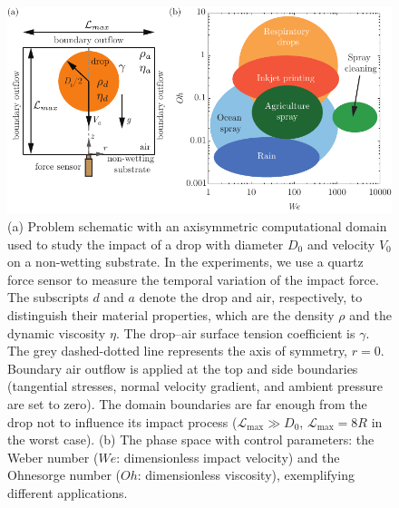 \documentclass{jfm}
\begin{document}
\begin{figure}
	\centering
	\includegraphics[width=\textwidth]{Figures/Schematic_v2.pdf}
	\caption{(a) Problem schematic with an axisymmetric computational domain used to study the impact of a drop with diameter $D_0$ and velocity $V_0$ on a non-wetting substrate. In the experiments, we use a quartz force sensor to measure the temporal variation of the impact force. The subscripts $d$ and $a$ denote the drop and air, respectively, to distinguish their material properties, which are the density $\rho$ and the dynamic viscosity $\eta$. The drop–air surface tension coefficient is $\gamma$. The grey dashed-dotted line represents the axis of symmetry, $r = 0$. Boundary air outflow is applied at the top and side boundaries (tangential stresses, normal velocity gradient, and ambient pressure are set to zero). The domain boundaries are far enough from the drop not to influence its impact process ($\mathcal{L}_\text{max} \gg D_0$, $\mathcal{L}_\text{max} = 8R$ in the worst case). (b) The phase space with control parameters: the Weber number ($We$: dimensionless impact velocity) and the Ohnesorge number ($Oh$: dimensionless viscosity), exemplifying different applications.}
	\label{fig:schematic}
\end{figure}
\end{document}
